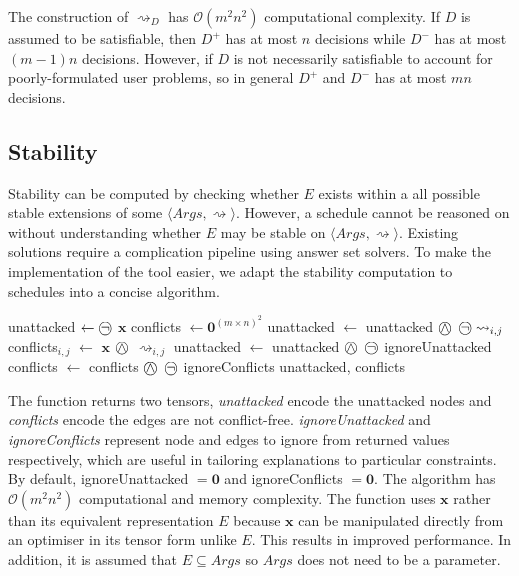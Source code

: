 The construction of $\rightsquigarrow_D$ has $\mathcal{O}(m^2n^2)$ computational complexity. If $D$ is assumed to be satisfiable, then $D^+$ has at most $n$ decisions while $D^-$ has at most $(m-1)n$ decisions. However, if $D$ is not necessarily satisfiable to account for poorly-formulated user problems, so in general $D^+$ and $D^-$ has at most $mn$ decisions.

\subsection{Stability}

Stability can be computed by checking whether $E$ exists within a all possible stable extensions of some $\langle Args, \rightsquigarrow\rangle$. However, a schedule cannot be reasoned on without understanding whether $E$ may be stable on $\langle Args, \rightsquigarrow\rangle$. Existing solutions require a complication pipeline using answer set solvers. To make the implementation of the tool easier, we adapt the stability computation to schedules into a concise algorithm.

\begin{algorithm}[H]
	\caption{}
	\begin{algorithmic}[1]
			\State unattacked $\gets\incircbin{\neg}$ $\mathbf{x}$
			\State conflicts $\gets\mathbf{0}^{(m\times n)^2}$
						\State unattacked $\gets$ unattacked $\incircbin{\land}$ $\incircbin{\neg}\rightsquigarrow_{i,j}$
						\State conflicts$_{i,j}$ $\gets$ $\mathbf{x}$ $\incircbin{\land}$ $\rightsquigarrow_{i,j}$ 
					\EndIf
				\EndFor
			\EndFor
			\State unattacked $\gets$ unattacked $\incircbin{\land}$ $\incircbin{\neg}$ ignoreUnattacked
			\State conflicts $\gets$ conflicts $\incircbin{\land}$ $\incircbin{\neg}$ ignoreConflicts
			\State \Return unattacked, conflicts
		\EndFunction
	\end{algorithmic}
\end{algorithm}

The function returns two tensors, \emph{unattacked} encode the unattacked nodes and \emph{conflicts} encode the edges are not conflict-free. \emph{ignoreUnattacked} and \emph{ignoreConflicts} represent node and edges to ignore from returned values respectively, which are useful in tailoring explanations to particular constraints. By default, ignoreUnattacked $=\mathbf{0}$ and ignoreConflicts $=\mathbf{0}$. The algorithm has $\mathcal{O}(m^2n^2)$ computational and memory complexity. The function uses $\mathbf{x}$ rather than its equivalent representation $E$ because $\mathbf{x}$ can be manipulated directly from an optimiser in its tensor form unlike $E$. This results in improved performance. In addition, it is assumed that $E\subseteq Args$ so $Args$ does not need to be a parameter.

